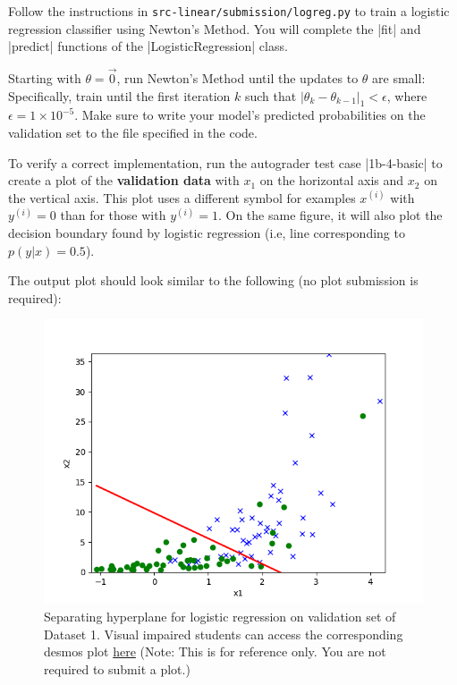 \item {}
Follow the instructions in \texttt{src-linear/submission/logreg.py} to train a logistic regression classifier using Newton's Method. You will complete the |fit| and |predict| functions of the |LogisticRegression| class.

Starting with $\theta = \vec{0}$, run Newton's Method until the updates to $\theta$ are small: Specifically,  train until the first iteration $k$ such that $\vert\theta_{k} - \theta_{k-1}\vert_1 < \epsilon$, where $\epsilon = 1\times 10^{-5}$. Make sure to write your model's predicted probabilities on the validation set to the file specified in the code.

To verify a correct implementation, run the autograder test case |1b-4-basic| to create a plot of the \textbf{validation data} with $x_1$ on the horizontal axis and $x_2$ on the vertical axis. This plot uses a different symbol for examples $x^{(i)}$ with $y^{(i)} = 0$ than for those with $y^{(i)} = 1$. On the same figure, it will also plot the decision boundary found by logistic regression (i.e, line corresponding to $p(y\vert x) = 0.5$).

The output plot should look similar to the following (no plot submission is required): 

\begin{figure}[H]
	\centering
	\vspace{2mm}
	\includegraphics[width=0.65\linewidth]{01-linearclass/p01b_pred_1.png}
    \caption{Separating hyperplane for logistic regression on validation set of Dataset 1. Visual impaired students can access the corresponding desmos plot \href{https://www.desmos.com/calculator/vl5mh1k4q2}{here} (Note: This is for reference only.  You are not required to submit a plot.)}
\end{figure}
